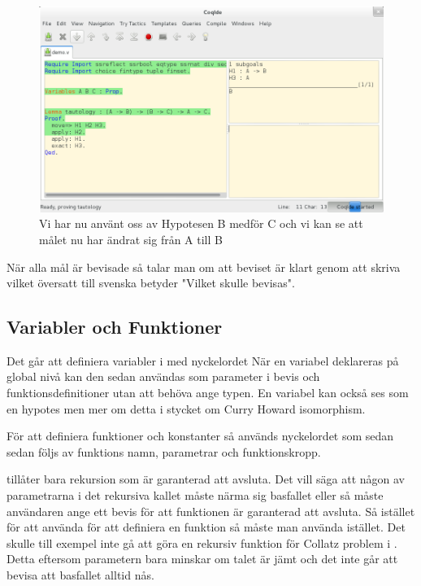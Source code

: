 \begin{figure}[H]
  \centering
  \includegraphics[width=150mm]{images/Proof_part3}
  \caption[Bevis i \coq IDE]
   {Vi har nu använt oss av Hypotesen B medför C och vi
    kan se att målet nu har ändrat sig från A till B}
\end{figure}

När alla mål är bevisade så talar man om att beviset är klart genom att skriva
 vilket översatt till svenska betyder "Vilket skulle bevisas".

\subsection{Variabler och Funktioner}

Det går att definiera variabler i \coq med nyckelordet  När en
variabel deklareras på global nivå kan den sedan användas som parameter i bevis
och funktionsdefinitioner utan att behöva ange typen. En variabel kan också ses
som en hypotes men mer om detta i stycket om Curry Howard isomorphism.

För att definiera funktioner och konstanter så används nyckelordet
 som sedan sedan följs av funktions namn, parametrar och
funktionskropp.

\coq tillåter bara rekursion som är garanterad att avsluta. Det vill säga att
någon av parametrarna i det rekursiva kallet måste närma sig basfallet eller så
måste användaren ange ett bevis för att funktionen är garanterad att avsluta.
Så istället för att använda  för att definiera en funktion så måste
man använda  istället. Det skulle till exempel inte gå att göra en
rekursiv funktion för Collatz problem i \coq. Detta eftersom parametern bara
minskar om talet är jämt och det inte går att bevisa att basfallet alltid nås.

